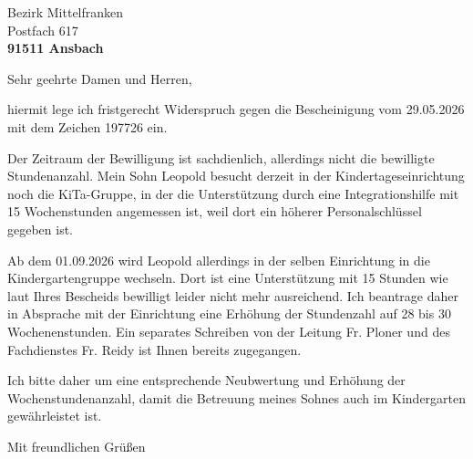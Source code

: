 \documentclass[a4paper,12pt]{dinbrief}
\begin{document}
 
\setbottomtexttop{2cm}
\subject{\textbf{Widerspruch Bescheid 197726 vom 29.05.2026} }
\signature{Dr.~Fabian Schury}
\Datum{\today} 
\address{Dr.~Fabian Schury \\ Reichenfelser Straße 10 \\ 91086 Aurachtal}
 
\begin{letter} 
{   Bezirk Mittelfranken \\
    Postfach 617 \\[0.5cm]
    \textbf{\Large 91511 Ansbach} }
\opening{ Sehr geehrte Damen und Herren,}

hiermit lege ich fristgerecht Widerspruch gegen die Bescheinigung vom
29.05.2026 mit dem Zeichen 197726 ein.

Der Zeitraum der Bewilligung ist sachdienlich, allerdings nicht die bewilligte
Stundenanzahl. Mein Sohn Leopold besucht derzeit in der Kindertageseinrichtung
noch die KiTa-Gruppe, in der die Unterstützung durch eine Integrationshilfe mit
15 Wochenstunden angemessen ist, weil dort ein höherer Personalschlüssel
gegeben ist. 

Ab dem 01.09.2026 wird Leopold allerdings in der selben Einrichtung in die
Kindergartengruppe wechseln. Dort ist eine Unterstützung mit 15 Stunden wie
laut Ihres Bescheids bewilligt leider nicht mehr ausreichend. Ich beantrage
daher in Absprache mit der Einrichtung eine Erhöhung der Stundenzahl auf 28 bis
30 Wochenenstunden. Ein separates Schreiben von der Leitung Fr. Ploner und des
Fachdienstes Fr. Reidy ist Ihnen bereits zugegangen. 

Ich bitte daher um eine entsprechende Neubwertung und Erhöhung der
Wochenstundenanzahl, damit die Betreuung meines Sohnes auch im Kindergarten
gewährleistet ist.

\closing{Mit freundlichen Grüßen} 
\end{letter}
\end{document}
